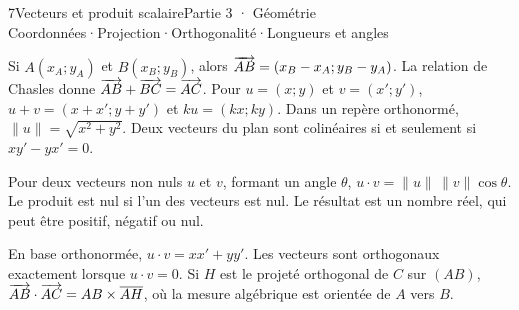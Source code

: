 \begin{ouverture}[vecteursplan]{7}{Vecteurs et produit scalaire}{Partie 3 · Géométrie}
{Coordonnées\enspace·\enspace Projection\enspace·\enspace Orthogonalité\enspace·\enspace Longueurs et angles}
\end{ouverture}
\essentiel
{}
\begin{propriete}
Si $A(x_A;y_A)$ et $B(x_B;y_B)$, alors $\overrightarrow{AB}=(x_B-x_A;y_B-y_A)$.
La relation de Chasles donne $\overrightarrow{AB}+\overrightarrow{BC}=\overrightarrow{AC}$.
Pour $u=(x;y)$ et $v=(x';y')$, $u+v=(x+x';y+y')$ et $ku=(kx;ky)$.
Dans un repère orthonormé, $\|u\|=\sqrt{x^2+y^2}$.
Deux vecteurs du plan sont colinéaires si et seulement si $xy'-yx'=0$.
\end{propriete}
\begin{definition}
Pour deux vecteurs non nuls $u$ et $v$, formant un angle $\theta$,
$u\cdot v=\|u\|\,\|v\|\cos\theta$. Le produit est nul si l'un des vecteurs est nul.
Le résultat est un nombre réel, qui peut être positif, négatif ou nul.
\end{definition}
\begin{propriete}
En base orthonormée, $u\cdot v=xx'+yy'$. Les vecteurs sont orthogonaux
exactement lorsque $u\cdot v=0$. Si $H$ est le projeté orthogonal de $C$
sur $(AB)$, $\overrightarrow{AB}\cdot\overrightarrow{AC}=AB\times\overline{AH}$,
où la mesure algébrique est orientée de $A$ vers $B$.
\end{propriete}
\begin{center}
\par{}
\end{center}


